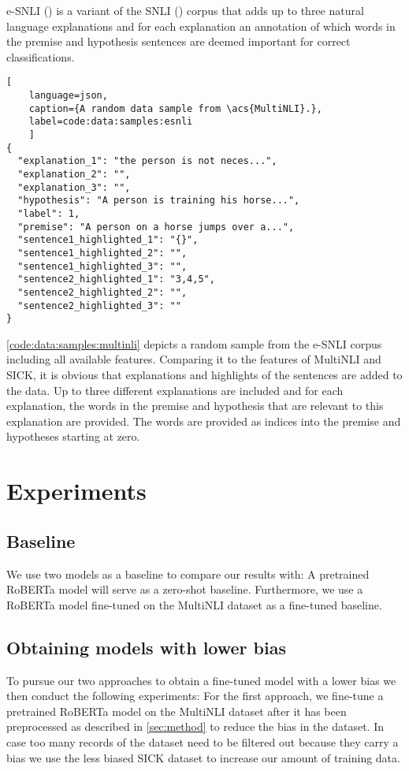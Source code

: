 \documentclass[12pt,a4paper]{article}
\begin{document}
\Acf{e-SNLI} (\cite{esnli}) is a variant of the \acs{SNLI} (\cite{snli}) corpus that adds up to three natural language explanations and for each explanation an annotation of which words in the premise and hypothesis sentences are deemed important for correct classifications.

\begin{lstlisting}[
    language=json,
    caption={A random data sample from \acs{MultiNLI}.},
    label=code:data:samples:esnli
    ]
{
  "explanation_1": "the person is not neces...",
  "explanation_2": "",
  "explanation_3": "",
  "hypothesis": "A person is training his horse...",
  "label": 1,
  "premise": "A person on a horse jumps over a...",
  "sentence1_highlighted_1": "{}",
  "sentence1_highlighted_2": "",
  "sentence1_highlighted_3": "",
  "sentence2_highlighted_1": "3,4,5",
  "sentence2_highlighted_2": "",
  "sentence2_highlighted_3": ""
}
\end{lstlisting}

\autoref{code:data:samples:multinli} depicts a random sample from the \acs{e-SNLI} corpus including all available features. Comparing it to the features of \acs{MultiNLI} and \acs{SICK}, it is obvious that explanations and highlights of the sentences are added to the data. Up to three different explanations are included and for each explanation, the words in the premise and hypothesis that are relevant to this explanation are provided. The words are provided as indices into the premise and hypotheses starting at zero.

\section{Experiments}
\subsection{Baseline}
We use two models as a baseline to compare our results with: A pretrained RoBERTa model will serve as a zero-shot baseline. Furthermore, we use a RoBERTa model fine-tuned on the MultiNLI dataset as a fine-tuned baseline.

\subsection{Obtaining models with lower bias}
To pursue our two approaches to obtain a fine-tuned model with a lower bias we then conduct the following experiments: For the first approach, we fine-tune a pretrained RoBERTa model on the MultiNLI dataset after it has been preprocessed as described in \autoref{sec:method} to reduce the bias in the dataset. In case too many records of the dataset need to be filtered out because they carry a bias we use the less biased SICK dataset to increase our amount of training data. 
\end{document}
